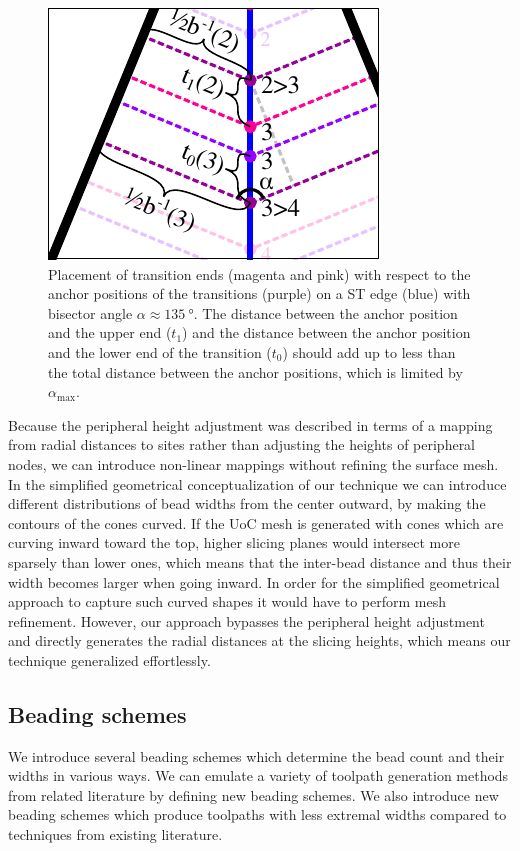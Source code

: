 \begin{figure}
\centering
\includegraphics[width=.4\columnwidth]{sources/method/transition_length_limit.pdf}
\caption{
Placement of transition ends (magenta and pink) with respect to the anchor positions of the transitions (purple) on a ST edge (blue) with bisector angle $\alpha \approx \SI{135}{\degree}$.
The distance between the anchor position and the upper end ($t_1$) and the distance between the anchor position and the lower end of the transition ($t_0$) should add up to less than the total distance between the anchor positions, which is limited by $\alpha_\text{max}$.
}
\label{transition_placement}
\end{figure}


Because the peripheral height adjustment was described in terms of a mapping from radial distances to sites rather than adjusting the heights of peripheral nodes,
we can introduce non-linear mappings without refining the surface mesh.
In the simplified geometrical conceptualization of our technique we can introduce different distributions of bead widths from the center outward, by making the contours of the cones curved.
If the UoC mesh is generated with cones which are curving inward toward the top, higher slicing planes would intersect more sparsely than lower ones, which means that the inter-bead distance and thus their width becomes larger when going inward.
In order for the simplified geometrical approach to capture such curved shapes it would have to perform mesh refinement.
However, our approach bypasses the peripheral height adjustment and directly generates the radial distances at the slicing heights, which means our technique generalized effortlessly.




\subsection{Beading schemes}
We introduce several beading schemes which determine the bead count and their widths in various ways.
We can emulate a variety of toolpath generation methods from related literature by defining new beading schemes.
We also introduce new beading schemes which produce toolpaths with less extremal widths compared to techniques from existing literature.

